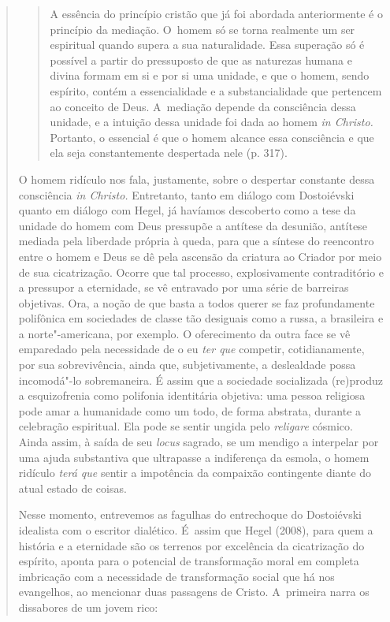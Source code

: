 {\begin{quote}
\begin{quote}
A essência do princípio cristão que já foi abordada anteriormente é o
princípio da mediação. O~homem só se torna realmente um ser espiritual
quando supera a sua naturalidade. Essa superação só é possível a partir
do pressuposto de que as naturezas humana e divina formam em si e por si
uma unidade, e que o homem, sendo espírito, contém a essencialidade e a
substancialidade que pertencem ao conceito de Deus. A~mediação depende
da consciência dessa unidade, e a intuição dessa unidade foi dada ao
homem \emph{in Christo.} Portanto, o essencial é que o homem alcance
essa consciência e que ela seja constantemente despertada nele (p. 317).
\end{quote}

O homem ridículo nos fala, justamente, sobre o despertar constante dessa
consciência \emph{in Christo.} Entretanto, tanto em diálogo com
Dostoiévski quanto em diálogo com Hegel, já havíamos descoberto como a
tese da unidade do homem com Deus pressupõe a antítese da desunião,
antítese mediada pela liberdade própria à queda, para que a síntese do
reencontro entre o homem e Deus se dê pela ascensão da criatura ao
Criador por meio de sua cicatrização. Ocorre que tal processo,
explosivamente contraditório e a pressupor a eternidade, se vê entravado
por uma série de barreiras objetivas. Ora, a noção de que basta a todos
querer se faz profundamente polifônica em sociedades de classe tão
desiguais como a russa, a brasileira e a norte"-americana, por exemplo. O
oferecimento da outra face se vê emparedado pela necessidade de o eu
\emph{ter que} competir, cotidianamente, por sua sobrevivência, ainda
que, subjetivamente, a deslealdade possa incomodá"-lo sobremaneira. É
assim que a sociedade socializada (re)produz a esquizofrenia como
polifonia identitária objetiva: uma pessoa religiosa pode amar a
humanidade como um todo, de forma abstrata, durante a celebração
espiritual. Ela pode se sentir ungida pelo \emph{religare} cósmico.
Ainda assim, à saída de seu \emph{locus} sagrado, se um mendigo a
interpelar por uma ajuda substantiva que ultrapasse a indiferença da
esmola, o homem ridículo \emph{terá que} sentir a impotência da
compaixão contingente diante do atual estado de coisas.

Nesse momento, entrevemos as fagulhas do entrechoque do Dostoiévski
idealista com o escritor dialético. É~assim que Hegel (2008), para quem
a história e a eternidade são os terrenos por excelência da cicatrização
do espírito, aponta para o potencial de transformação moral em completa
imbricação com a necessidade de transformação social que há nos
evangelhos, ao mencionar duas passagens de Cristo. A~primeira narra os
dissabores de um jovem rico:


\end{quote}}
